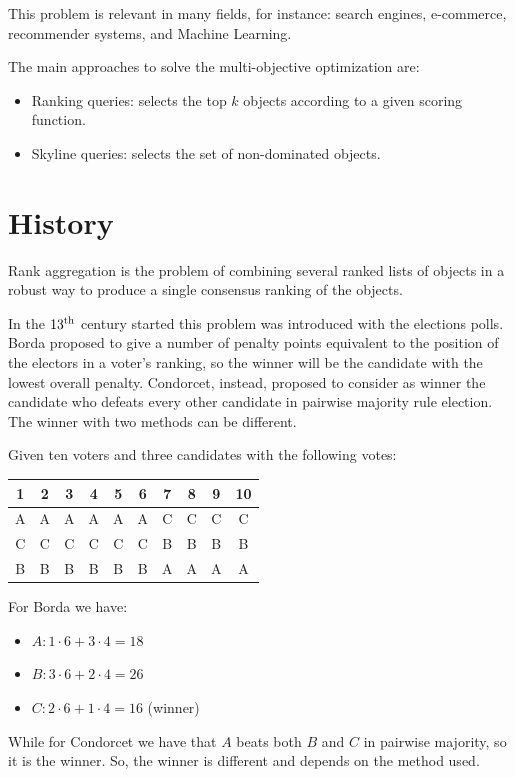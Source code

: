 \documentclass[12pt, a4paper]{report}
\newtheorem[style=M,bodystyle=\normalfont]{theorem}{Theorem}
\newtheorem[style=M,bodystyle=\normalfont]{corollary}{Corollary}
\newtheorem[style=M,bodystyle=\normalfont]{lemma}{Lemma}
\newtheorem[style=M,bodystyle=\normalfont]{definition}{Definition}
\begin{document}
    This problem is relevant in many fields, for instance: search engines, e-commerce, recommender systems, and Machine Learning. 

    The main approaches to solve the multi-objective optimization are: 
    \begin{itemize}
        \item Ranking queries: selects the top $k$ objects according to a given scoring function.
        \item Skyline queries: selects the set of non-dominated objects. 
    \end{itemize}

    \section{History}
    Rank aggregation is the problem of combining several ranked lists of objects in a robust way to produce a single consensus ranking of the objects. 

    In the $13^{\textnormal{th}}$ century started this problem was introduced with the elections polls. Borda proposed to give a number of penalty points equivalent to the position 
    of the electors in a voter's ranking, so the winner will be the candidate with the lowest overall penalty. Condorcet, instead, proposed to consider as winner the candidate who 
    defeats every other candidate in pairwise majority rule election. The winner with two methods can be different. 
    \begin{example}
        Given ten voters and three candidates with the following votes: 
        \begin{table}[H]
            \centering
            \begin{tabular}{|c|c|c|c|c|c|c|c|c|c|}
            \hline
            1 & 2 & 3 & 4 & 5 & 6 & 7 & 8 & 9 & 10 \\ \hline
            A & A & A & A & A & A & C & C & C & C  \\ 
            C & C & C & C & C & C & B & B & B & B  \\ 
            B & B & B & B & B & B & A & A & A & A  \\ \hline
            \end{tabular}
        \end{table}
        For Borda we have: 
        \begin{itemize}
            \item $A: 1 \cdot 6+3 \cdot 4 = 18$
            \item $B: 3 \cdot 6+2 \cdot 4 = 26$
            \item $C: 2 \cdot 6+1 \cdot 4 = 16$ (winner)
        \end{itemize}
        While for Condorcet we have that $A$ beats both $B$ and $C$ in pairwise majority, so it is the winner. So, the winner is different and depends on the method used. 
    \end{example}
\end{document}
